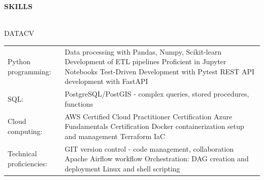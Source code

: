 \documentclass[letterpaper]{article}
\newcommand{\lineunder} {
        \vspace*{-8pt} \\
        \hspace*{-18pt} \hrulefill \\
    }
\newcommand{\header} [1] {
        \vspace{9pt}
        {\hspace*{-18pt}\vspace*{6pt} \large \textbf {#1}}
        \vspace*{-6pt} \lineunder
        \vspace{2pt}
    }
\newenvironment{skillslist}
        {
            \hspace*{-0.07in}\begin{tabular}[t]{ l L{5.17in} }
        }{
            \end{tabular}
        }
\begin{document}
\header{SKILLS}
    \begin{taggedblock}{DATACV}
        \begin{skillslist}
            Python programming:&
                Data processing with Pandas, Numpy, Scikit-learn \linebreak
                Development of ETL pipelines \linebreak
                Proficient in Jupyter Notebooks \linebreak
                Test-Driven Development with Pytest \linebreak
                REST API development with FastAPI \linebreak
                \\
            SQL:&
                PostgreSQL/PostGIS - complex queries, stored procedures, functions \linebreak
                \\
            Cloud computing:&
                AWS Certified Cloud Practitioner Certification \linebreak
                Azure Fundamentals Certification \linebreak
                Docker containerization setup and management \linebreak
                Terraform IaC \linebreak
                \\
            Technical proficiencies:&
                GIT version control - code management, collaboration \linebreak
                Apache Airflow workflow Orchestration: DAG creation and deployment \linebreak
                Linux and shell scripting \linebreak
                \\
        \end{skillslist}
    \end{taggedblock}
\end{document}

